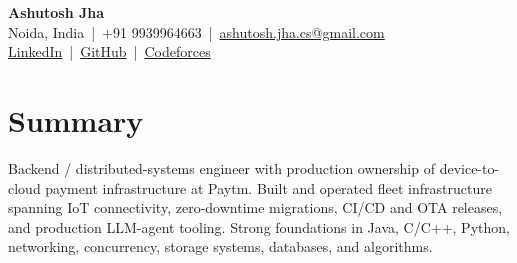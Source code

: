 \documentclass[letterpaper,10pt]{article}
\begin{document}
\begin{center}
    {\fontsize{17}{19}\selectfont\textbf{Ashutosh Jha}}\\[-1pt]
    \small
    Noida, India \,|\, +91 9939964663 \,|\,
    \href{mailto:ashutosh.jha.cs@gmail.com}{ashutosh.jha.cs@gmail.com}
    \\[-1pt]
    \href{https://linkedin.com/in/thealonemusk}{LinkedIn}
    \,|\,
    \href{https://github.com/thealonemusk}{GitHub}
    \,|\,
    \href{https://codeforces.com/profile/thealonemusk}{Codeforces}
\end{center}

\vspace{-7pt}

\section{Summary}
\small
Backend / distributed-systems engineer with production ownership of device-to-cloud payment infrastructure at Paytm. Built and operated fleet infrastructure spanning IoT connectivity, zero-downtime migrations, CI/CD and OTA releases, and production LLM-agent tooling. Strong foundations in Java, C/C++, Python, networking, concurrency, storage systems, databases, and algorithms.

\end{document}
